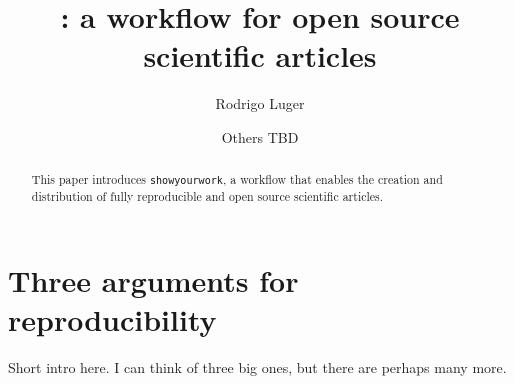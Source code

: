 \documentclass[modern]{aastex631}
\newcommand\xxx[1]{{\color{red}#1}}
\newcommand\syw{\texttt{showyourwork}\xspace}
\begin{document}
\title{\showyourwork: a workflow for open source scientific articles}

\author[0000-0002-0296-3826]{Rodrigo Luger}
\author{Others TBD}

%
\begin{abstract}
    This paper introduces \syw, a workflow that enables the creation and distribution of fully reproducible and open source scientific articles.
\end{abstract}

%
\section{Three arguments for reproducibility}
\label{sec:args}
\xxx{Short intro here. I can think of three big ones, but there are perhaps many more.}

\end{document}
